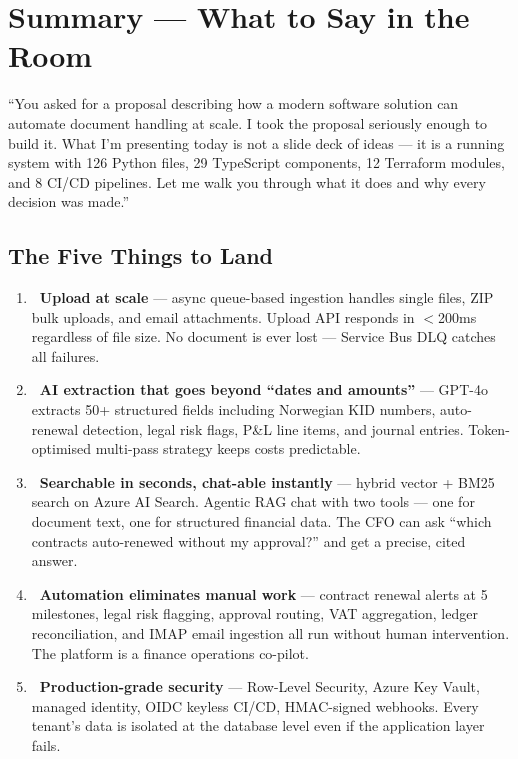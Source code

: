 \documentclass[12pt,a4paper]{article}
\begin{document}
\newpage

\section{Summary — What to Say in the Room}

\begin{tcolorbox}[colback=NordicBlue!8, colframe=NordicBlue, boxrule=1.5pt, arc=6pt,
  title={\textbf{\color{NordicBlue}Opening statement (30 seconds)}}]
``You asked for a proposal describing how a modern software solution can automate document handling at scale. I took the proposal seriously enough to build it. What I'm presenting today is not a slide deck of ideas — it is a running system with 126 Python files, 29 TypeScript components, 12 Terraform modules, and 8 CI/CD pipelines. Let me walk you through what it does and why every decision was made.''
\end{tcolorbox}

\vspace{1em}

\subsection*{The Five Things to Land}

\begin{enumerate}[leftmargin=*, itemsep=8pt]
  \item \textbf{\faUpload~Upload at scale} — async queue-based ingestion handles single files, ZIP bulk uploads, and email attachments. Upload API responds in $<$200ms regardless of file size. No document is ever lost — Service Bus DLQ catches all failures.

  \item \textbf{\faRobot~AI extraction that goes beyond ``dates and amounts''} — GPT-4o extracts 50+ structured fields including Norwegian KID numbers, auto-renewal detection, legal risk flags, P\&L line items, and journal entries. Token-optimised multi-pass strategy keeps costs predictable.

  \item \textbf{\faSearch~Searchable in seconds, chat-able instantly} — hybrid vector + BM25 search on Azure AI Search. Agentic RAG chat with two tools — one for document text, one for structured financial data. The CFO can ask ``which contracts auto-renewed without my approval?'' and get a precise, cited answer.

  \item \textbf{\faCogs~Automation eliminates manual work} — contract renewal alerts at 5 milestones, legal risk flagging, approval routing, VAT aggregation, ledger reconciliation, and IMAP email ingestion all run without human intervention. The platform is a finance operations co-pilot.

  \item \textbf{\faShieldAlt~Production-grade security} — Row-Level Security, Azure Key Vault, managed identity, OIDC keyless CI/CD, HMAC-signed webhooks. Every tenant's data is isolated at the database level even if the application layer fails.
\end{enumerate}
\end{document}
